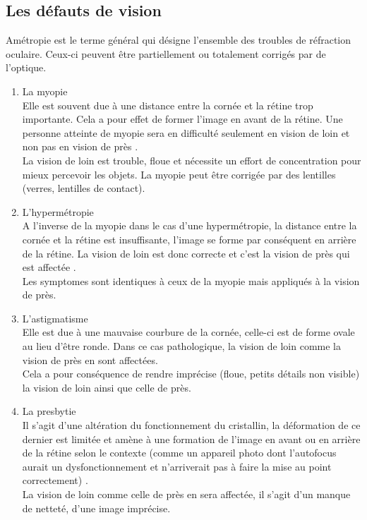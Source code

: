 \documentclass[french,a4paper]{report}
\begin{document}
{\subsection{Les défauts de vision}
Amétropie est le terme général qui désigne l'ensemble des troubles de réfraction oculaire. Ceux-ci peuvent être partiellement ou totalement corrigés par de l'optique.\\
\begin{enumerate}
\item La myopie
\\Elle est souvent due à une distance entre la cornée et la rétine trop importante. Cela a pour effet de former l'image en avant de la rétine. Une personne atteinte de myopie sera en difficulté seulement en vision de loin et non pas en vision de près \cite{descpaterrrefrac}.
\\La vision de loin est trouble, floue et nécessite un effort de concentration pour mieux percevoir les objets. La myopie peut être corrigée par des lentilles (verres, lentilles de contact).
\newline
\item L'hypermétropie
\\A l'inverse de la myopie dans le cas d'une hypermétropie, la distance entre la cornée et la rétine est insuffisante, l'image se forme par conséquent en arrière de la rétine. La vision de loin est donc correcte et c'est la vision de près qui est affectée \cite{descpaterrrefrac}.
\\Les \glspl{symptome} sont identiques à ceux de la myopie mais appliqués à la vision de près.
\newline
\item L'astigmatisme
\\Elle est due à une mauvaise courbure de la cornée, celle-ci est de forme ovale au lieu d'être ronde. Dans ce cas pathologique, la vision de loin comme la vision de près en sont affectées.
\\Cela a pour conséquence de rendre imprécise (floue, petits détails non visible) la vision de loin ainsi que celle de près.
\newline
\item La presbytie
\\Il s'agit d'une altération du fonctionnement du cristallin, la déformation de ce dernier est limitée et amène à une formation de l'image en avant ou en arrière de la rétine selon le contexte (comme un appareil photo dont l'autofocus aurait un dysfonctionnement et n'arriverait pas à faire la mise au point correctement) \cite{descpaterrrefrac}.
\\La vision de loin comme celle de près en sera affectée, il s'agit d'un manque de netteté, d'une image imprécise.\\
\end{enumerate}
}
\end{document}
